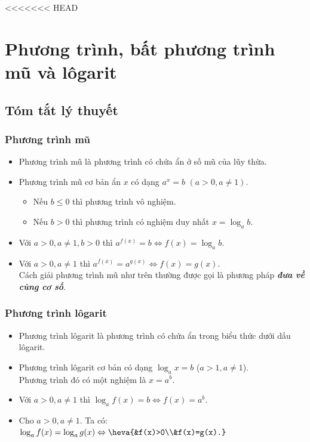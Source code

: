 <<<<<<< HEAD
 
\section{Phương trình, bất phương trình mũ và lôgarit}
\subsection{Tóm tắt lý thuyết}
\begin{tomtat}
	\subsubsection{Phương trình mũ}
	\begin{itemize}
		\item Phương trình mũ là phương trình có chứa ẩn ở số mũ của lũy thừa.
		\item Phương trình mũ cơ bản ẩn $x$ có dạng $a^x=b \,\, (a>0, a\neq 1)$.
		\begin{itemize}
			\item Nếu $b\leq 0$ thì phương trình vô nghiệm.
			\item Nếu $b>0$ thì phương trình có nghiệm duy nhất $x=\log_a b$.
		\end{itemize}
	\end{itemize}
	\begin{nx}\hfill
		\begin{itemize}
			\item Với $a>0, a\neq 1, b>0$ thì $a^{f(x)}=b \Leftrightarrow f(x)=\log_a b$.
			\item Với $a>0, a\neq 1$ thì $a^{f(x)}=a^{g(x)} \Leftrightarrow f(x)=g(x)$.\\
			Cách giải phương trình mũ như trên thường được gọi là phương pháp \textbf{\textit{đưa về cùng cơ số}}.
		\end{itemize}
	\end{nx}
	\subsubsection{Phương trình lôgarit}
	\begin{itemize}
		\item Phương trình lôgarit là phương trình có chứa ẩn trong biểu thức dưới dấu lôgarit.
		\item Phương trình lôgarit cơ bản có dạng $\log_a x=b$ ($a>1, a\neq 1$).\\
		Phương trình đó có một nghiệm là $x=a^b$.
	\end{itemize}
	\begin{nx}\hfill
		\begin{itemize}
			\item Với $a>0, a\neq 1$ thì $\log_a f(x)=b \Leftrightarrow f(x)=a^b$.
			\item Cho $a>0, a\neq 1$. Ta có: $\log_a f(x)=\log_a g(x) \Leftrightarrow \heva{&f(x)>0\\&f(x)=g(x).}$
		\end{itemize}
	\end{nx}

\end{tomtat}

